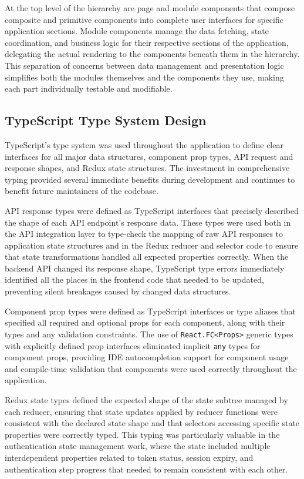 At the top level of the hierarchy are page and module components that compose composite and primitive components into complete user interfaces for specific application sections. Module components manage the data fetching, state coordination, and business logic for their respective sections of the application, delegating the actual rendering to the components beneath them in the hierarchy. This separation of concerns between data management and presentation logic simplifies both the modules themselves and the components they use, making each part individually testable and modifiable.

\subsection{TypeScript Type System Design}

TypeScript's type system was used throughout the application to define clear interfaces for all major data structures, component prop types, API request and response shapes, and Redux state structures. The investment in comprehensive typing provided several immediate benefits during development and continues to benefit future maintainers of the codebase.

API response types were defined as TypeScript interfaces that precisely described the shape of each API endpoint's response data. These types were used both in the API integration layer to type-check the mapping of raw API responses to application state structures and in the Redux reducer and selector code to ensure that state transformations handled all expected properties correctly. When the backend API changed its response shape, TypeScript type errors immediately identified all the places in the frontend code that needed to be updated, preventing silent breakages caused by changed data structures.

Component prop types were defined as TypeScript interfaces or type aliases that specified all required and optional props for each component, along with their types and any validation constraints. The use of \texttt{React.FC<Props>} generic types with explicitly defined prop interfaces eliminated implicit \texttt{any} types for component props, providing IDE autocompletion support for component usage and compile-time validation that components were used correctly throughout the application.

Redux state types defined the expected shape of the state subtree managed by each reducer, ensuring that state updates applied by reducer functions were consistent with the declared state shape and that selectors accessing specific state properties were correctly typed. This typing was particularly valuable in the authentication state management work, where the state included multiple interdependent properties related to token status, session expiry, and authentication step progress that needed to remain consistent with each other.

